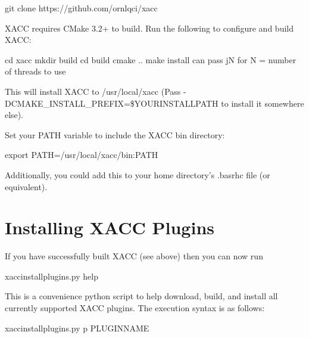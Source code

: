 \documentclass[letterpaper,10pt,english]{sphinxmanual}
\begin{document}
\begin{sphinxVerbatim}[commandchars=\\\{\}]
\PYGZdl{} git clone https://github.com/ornl\PYGZhy{}qci/xacc
\end{sphinxVerbatim}

XACC requires CMake 3.2+ to build. Run the following to
configure and build XACC:

\begin{sphinxVerbatim}[commandchars=\\\{\}]
\PYGZdl{} cd xacc \PYGZam{}\PYGZam{} mkdir build \PYGZam{}\PYGZam{} cd build
\PYGZdl{} cmake ..
\PYGZdl{} make install \PYGZsh{} can pass \PYGZhy{}jN for N = number of threads to use
\end{sphinxVerbatim}

This will install XACC to /usr/local/xacc
(Pass -DCMAKE\_INSTALL\_PREFIX=\$YOURINSTALLPATH to install it somewhere else).

Set your PATH variable to include the XACC bin directory:

\begin{sphinxVerbatim}[commandchars=\\\{\}]
\PYGZdl{} export PATH=/usr/local/xacc/bin:\PYGZdl{}PATH
\end{sphinxVerbatim}

Additionally, you could add this to your home directory’s .basrhc file (or equivalent).


\section{Installing XACC Plugins}
\label{\detokenize{install:installing-xacc-plugins}}
If you have successfully built XACC (see above)
then you can now run

\begin{sphinxVerbatim}[commandchars=\\\{\}]
\PYGZdl{} xacc\PYGZhy{}install\PYGZhy{}plugins.py \PYGZhy{}\PYGZhy{}help
\end{sphinxVerbatim}

This is a convenience python script to help download, build, and install
all currently supported XACC plugins. The execution syntax is as follows:

\begin{sphinxVerbatim}[commandchars=\\\{\}]
\PYGZdl{} xacc\PYGZhy{}install\PYGZhy{}plugins.py \PYGZhy{}p PLUGIN\PYGZhy{}NAME
\end{sphinxVerbatim}
\end{document}
